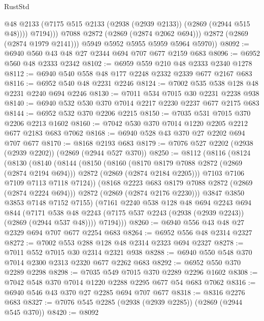 \begin{lexlean}{RustStd}
\begin{coremodule}
{\begin{coremodule}
{{{{{{{{{{{{                    @48
                    @2133
                    (@7175 @515 @2133 (@2938 (@2939 @2133)) (@2869 (@2944 @515 @48))))
                  @7194)))
            @7088
            @2872
            (@2869 (@2874 @2062 @694)))
          @2872
          (@2869 (@2874 @1979 @2141)))
        @5949
        @5952
        @5955
        @5959
        @5964
        @5970))
@8092 := @6940 @560 @43 @48 @27 @2344 @694 @707 @677 @2159 @683
@8096 := @6952 @560 @48 @2333 @2342
@8102 := @6959 @559 @210 @48 @2333 @2340 @1278
@8112 := @6940 @540 @558 @48 @177 @2248 @2332 @2339 @677 @2167 @683
@8116 := @6952 @540 @48 @2231 @2246
@8124 := @7002 @535 @538 @128 @48 @2231 @2240 @694 @2246
@8130 := @7011 @534 @7015 @30 @2231 @2238 @938
@8140 := @6940 @532 @530 @370 @7014 @2217 @2230 @2237 @677 @2175 @683
@8144 := @6952 @532 @370 @2206 @2215
@8150 := @7035 @531 @7015 @370 @2206 @2213 @1602
@8160 := @7042 @530 @370 @7014 @1220 @2205 @2212 @677 @2183 @683 @7062
@8168 := @6940 @528 @43 @370 @27 @2202 @694 @707 @677
@8170 := @8168 @2193 @683
@8179 := @7076 @527 @2202 (@2938 (@2939 @2202)) (@2869 (@2944 @527 @370))
@8250 := @8112
    (@8116
      (@8124
        (@8130
          (@8140
            (@8144
              (@8150
                (@8160
                  (@8170 @8179 @7088 @2872 (@2869 (@2874 @2194 @694)))
                  @2872
                  (@2869 (@2874 @2184 @2205)))
                @7103
                @7106
                @7109
                @7113
                @7118
                @7124))
            (@8168 @2223 @683 @8179 @7088 @2872 (@2869 (@2874 @2224 @694)))
            @2872
            (@2869 (@2874 @2176 @2230)))
          @3847
          @3850
          @3853
          @7148
          @7152
          @7155)
        (@7161
          @2240
          @538
          @128
          @48
          @694
          @2243
          @694
          @844
          (@7171 @538 @48 @2243 (@7175 @537 @2243 (@2938 (@2939 @2243)) (@2869 (@2944 @537 @48))))
          @7194)))
@8260 := @6940 @556 @43 @48 @27 @2329 @694 @707 @677 @2254 @683
@8264 := @6952 @556 @48 @2314 @2327
@8272 := @7002 @553 @288 @128 @48 @2314 @2323 @694 @2327
@8278 := @7011 @552 @7015 @30 @2314 @2321 @938
@8288 := @6940 @550 @548 @370 @7014 @2300 @2313 @2320 @677 @2262 @683
@8292 := @6952 @550 @370 @2289 @2298
@8298 := @7035 @549 @7015 @370 @2289 @2296 @1602
@8308 := @7042 @548 @370 @7014 @1220 @2288 @2295 @677 @54 @683 @7062
@8316 := @6940 @546 @43 @370 @27 @2285 @694 @707 @677
@8318 := @8316 @2276 @683
@8327 := @7076 @545 @2285 (@2938 (@2939 @2285)) (@2869 (@2944 @545 @370))
@8420 := @8092
}}}}}}}}}}}}
\end{coremodule}}
\end{coremodule}
\end{lexlean}

